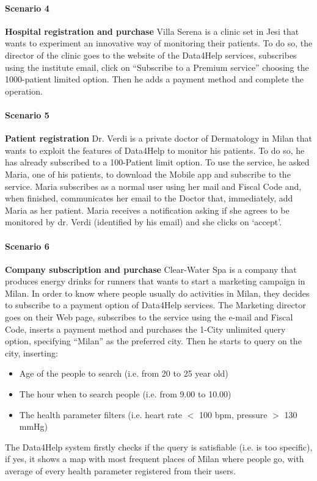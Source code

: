 \paragraph{Scenario 4} \textbf{Hospital registration and purchase } \newline
Villa Serena is a clinic set in Jesi that wants to experiment an innovative way of monitoring their patients. To do so, the director of the clinic goes to the website of the Data4Help services, subscribes using the institute email, click on “Subscribe to a Premium service” choosing the 1000-patient limited option. Then he adds a payment method and complete the operation.



\paragraph{Scenario 5} \textbf{Patient registration} \newline
Dr. Verdi is a private doctor of Dermatology in Milan that wants to exploit the features of Data4Help to monitor his patients. To do so, he has already subscribed to a 100-Patient limit option. To use the service, he asked Maria, one of his patients, to download the Mobile app and subscribe to the service.
Maria subscribes as a normal user using her mail and Fiscal Code and, when finished, communicates her email to the Doctor that, immediately, add Maria as her patient. Maria receives a notification asking if she agrees to be monitored by dr. Verdi (identified by his email) and she clicks on ‘accept’.



\paragraph{Scenario 6} \textbf{Company subscription and purchase} \newline
Clear-Water Spa is a company that produces energy drinks for runners that wants to start a marketing campaign in Milan. In order to know where people usually do activities in Milan, they decides to subscribe to a payment option of Data4Help services. The Marketing director goes on their Web page, subscribes to the service using the e-mail and Fiscal Code, inserts a payment method and purchases the 1-City unlimited query option, specifying “Milan” as the preferred city.
Then he starts to query on the city, inserting:
\begin{itemize}
    \item Age of the people to search (i.e. from 20 to 25 year old)
    \item The hour when to search people (i.e. from 9.00 to 10.00)
    \item The health parameter filters (i.e. heart rate $<$ 100 bpm, pressure $>$ 130 mmHg)
\end{itemize}
 The Data4Help system firstly checks if the query is satisfiable (i.e. is too specific), if yes, it shows a map with most frequent places of Milan where people go, with average of every health parameter registered from their users.



